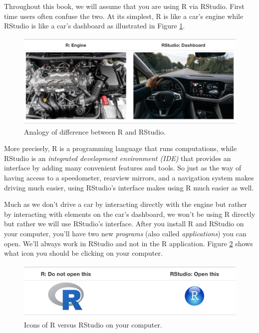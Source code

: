 \documentclass[
  12pt,
  oneside]{book}
\begin{document}
Throughout this book, we will assume that you are using R via RStudio. First time users often confuse the two. At its simplest, R is like a car's engine while RStudio is like a car's dashboard as illustrated in Figure \ref{fig:R-vs-RStudio-1}.

\begin{figure}
\includegraphics[width=0.95\linewidth]{fig/R_vs_RStudio_1} \caption{Analogy of difference between R and RStudio.}\label{fig:R-vs-RStudio-1}
\end{figure}

More precisely, R is a programming language that runs computations, while RStudio is an \emph{integrated development environment (IDE)} that provides an interface by adding many convenient features and tools. So just as the way of having access to a speedometer, rearview mirrors, and a navigation system makes driving much easier, using RStudio's interface makes using R much easier as well.

Much as we don't drive a car by interacting directly with the engine but rather by interacting with elements on the car's dashboard, we won't be using R directly but rather we will use RStudio's interface. After you install R and RStudio on your computer, you'll have two new \emph{programs} (also called \emph{applications}) you can open. We'll always work in RStudio and not in the R application. Figure \ref{fig:R-vs-RStudio-2a} shows what icon you should be clicking on your computer.

\begin{figure}
\includegraphics[width=0.9\linewidth]{fig/R_vs_RStudio} \caption{Icons of R versus RStudio on your computer.}\label{fig:R-vs-RStudio-2a}
\end{figure}
\end{document}
